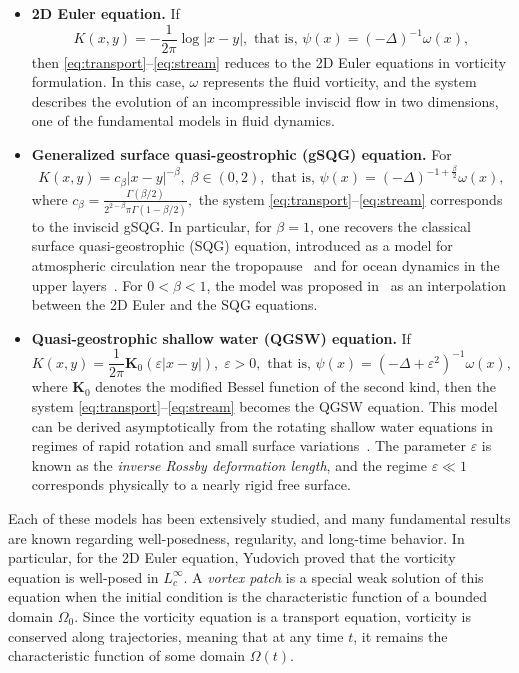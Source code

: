 \documentclass[a4paper]{amsart}
\theoremstyle{definition}
\begin{document}
\begin{itemize}
\item \textbf{2D Euler equation.}
If 
$$K(x,y) = -\frac{1}{2\pi}\log|x-y|, 
\text{ that is, } \psi(x) = (-\Delta)^{-1}\omega(x),$$
then \eqref{eq:transport}–\eqref{eq:stream} reduces to the 2D Euler equations in vorticity formulation. 
In this case, $\omega$ represents the fluid vorticity, and the system describes the evolution of an incompressible inviscid flow in two dimensions, one of the fundamental models in fluid dynamics.

\item \textbf{Generalized surface quasi-geostrophic (gSQG) equation.} For
$$K(x,y) = c_\beta |x-y|^{-\beta}, 
\; \beta \in (0,2),
\text{ that is, } \psi(x) = (-\Delta)^{-1+\frac{\beta}{2}}\omega(x),$$
where $c_\beta = \frac{\Gamma(\beta/2)}{2^{2-\beta}\pi\Gamma(1-\beta/2)},$ the system \eqref{eq:transport}–\eqref{eq:stream} corresponds to the inviscid gSQG. 
In particular, for $\beta=1$, one recovers the classical surface quasi-geostrophic (SQG) equation, introduced as a model for atmospheric circulation near the tropopause~\cite{sQG95} and for ocean dynamics in the upper layers~\cite{SQG2002}. 
For $0<\beta<1$, the model was proposed in~\cite{CordobaRodrigoaSQG} as an interpolation between the 2D Euler and the SQG equations.

\item \textbf{Quasi-geostrophic shallow water (QGSW) equation.} If 
$$K(x,y) = \frac{1}{2\pi}\mathbf{K}_0(\varepsilon |x-y|), 
\; \varepsilon>0,
\text{ that is, } \psi(x) = (-\Delta+\varepsilon^2)^{-1}\omega(x),$$
where $\mathbf{K}_0$ denotes the modified Bessel function of the second kind, then the system \eqref{eq:transport}–\eqref{eq:stream} becomes the QGSW equation. 
This model can be derived asymptotically from the rotating shallow water equations in regimes of rapid rotation and small surface variations~\cite{vallis2017atmospheric}. 
The parameter $\varepsilon$ is known as the \textit{inverse Rossby deformation length}, and the regime $\varepsilon \ll 1$ corresponds physically to a nearly rigid free surface.
\end{itemize}

Each of these models has been extensively studied, and many fundamental results are known regarding well-posedness, regularity, and long-time behavior. In particular, for the 2D Euler equation, Yudovich \cite{yudovich} proved that the vorticity equation is well-posed in \(L^\infty_c\). A \textit{vortex patch} is a special weak solution of this equation when the initial condition is the characteristic function of a bounded domain \(\Omega_0\). Since the vorticity equation is a transport equation, vorticity is conserved along trajectories, meaning that at any time \(t\), it remains the characteristic function of some domain \(\Omega(t)\).
\end{document}
